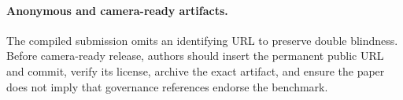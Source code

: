 \paragraph{Anonymous and camera-ready artifacts.}
The compiled submission omits an identifying URL to preserve double blindness. Before camera-ready release, authors should insert the permanent public URL and commit, verify its license, archive the exact artifact, and ensure the paper does not imply that governance references endorse the benchmark.
